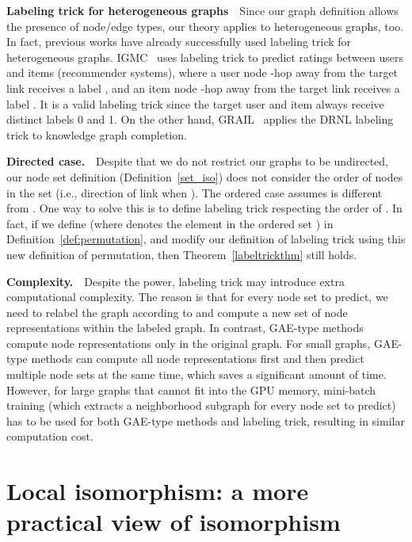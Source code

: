 \documentclass{article}
\begin{document}
\noindent\textbf{Labeling trick for heterogeneous graphs}~~Since our graph definition  allows the presence of node/edge types, our theory applies to heterogeneous graphs, too. In fact, previous works have already successfully used labeling trick for heterogeneous graphs. IGMC~\citep{Zhang2020Inductive} uses labeling trick to predict ratings between users and items (recommender systems), where a user node -hop away from the target link receives a label , and an item node -hop away from the target link receives a label . It is a valid labeling trick since the target user and item always receive distinct labels 0 and 1. On the other hand, GRAIL~\citep{teru2020inductive} applies the DRNL labeling trick to knowledge graph completion.


\noindent\textbf{Directed case.}~~Despite that we do not restrict our graphs to be undirected, our node set definition (Definition~\ref{set_iso}) does not consider the order of nodes in the set (i.e., direction of link when ). The ordered case assumes  is different from . One way to solve this is to define labeling trick respecting the order of . In fact, if we define  (where  denotes the  element in the ordered set ) in Definition~\ref{def:permutation}, and modify our definition of labeling trick using this new definition of permutation, then Theorem~\ref{labeltrickthm} still holds.




\noindent\textbf{Complexity.}~~Despite the power, labeling trick may introduce extra computational complexity. The reason is that for every node set  to predict, we need to relabel the graph  according to  and compute a new set of node representations within the labeled graph. In contrast, GAE-type methods compute node representations only in the original graph. For small graphs, GAE-type methods can compute all node representations first and then predict multiple node sets at the same time, which saves a significant amount of time. However, for large graphs that cannot fit into the GPU memory, mini-batch training (which extracts a neighborhood subgraph for every node set to predict) has to be used for both GAE-type methods and labeling trick, resulting in similar computation cost.














\section{Local isomorphism: a more practical view of isomorphism}\label{localiso}
\end{document}
